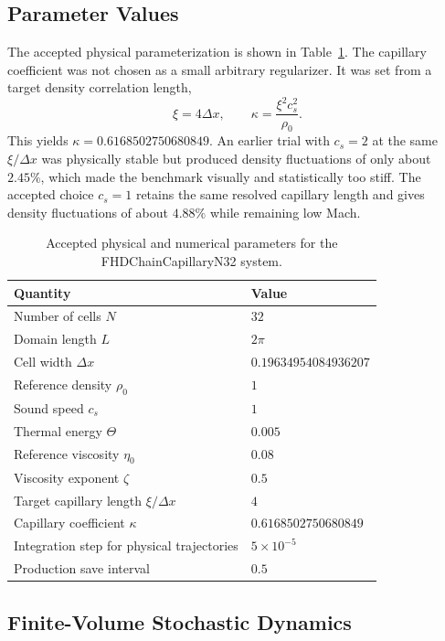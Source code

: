 \documentclass[11pt]{article}
\begin{document}
\subsection{Parameter Values}

The accepted physical parameterization is shown in Table~\ref{tab:parameters}.  The capillary coefficient was not chosen as a small arbitrary regularizer.  It was set from a target density correlation length,
\begin{equation}
    \xi=4\Delta x,
    \qquad
    \kappa=\frac{\xi^2 c_s^2}{\rho_0}.
\end{equation}
This yields \(\kappa=0.6168502750680849\).  An earlier trial with \(c_s=2\) at the same \(\xi/\Delta x\) was physically stable but produced density fluctuations of only about \(2.45\%\), which made the benchmark visually and statistically too stiff.  The accepted choice \(c_s=1\) retains the same resolved capillary length and gives density fluctuations of about \(4.88\%\) while remaining low Mach.

\begin{table}[tbp]
\centering
\caption{Accepted physical and numerical parameters for the FHDChainCapillaryN32 system.}
\label{tab:parameters}
\begin{tabular}{ll}
\toprule
Quantity & Value \\
\midrule
Number of cells \(N\) & \(32\) \\
Domain length \(L\) & \(2\pi\) \\
Cell width \(\Delta x\) & \(0.19634954084936207\) \\
Reference density \(\rho_0\) & \(1\) \\
Sound speed \(c_s\) & \(1\) \\
Thermal energy \(\Theta\) & \(0.005\) \\
Reference viscosity \(\eta_0\) & \(0.08\) \\
Viscosity exponent \(\zeta\) & \(0.5\) \\
Target capillary length \(\xi/\Delta x\) & \(4\) \\
Capillary coefficient \(\kappa\) & \(0.6168502750680849\) \\
Integration step for physical trajectories & \(5\times 10^{-5}\) \\
Production save interval & \(0.5\) \\
\bottomrule
\end{tabular}
\end{table}

\subsection{Finite-Volume Stochastic Dynamics}
\end{document}
